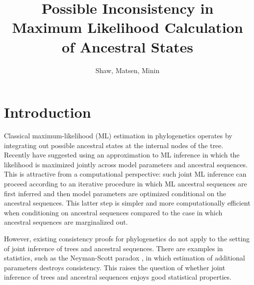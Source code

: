 \documentclass[a4paper]{article}
\title{Possible Inconsistency in Maximum Likelihood Calculation of Ancestral States}
\author{Shaw, Matsen, Minin}
\begin{document}
\maketitle


\renewcommand{\arraystretch}{1.2} %


\section*{Introduction}

Classical maximum-likelihood (ML) estimation in phylogenetics operates by integrating out possible ancestral states at the internal nodes of the tree.
Recently \cite{Neher2017} have suggested using an approximation to ML inference in which the likelihood is maximized jointly across model parameters and ancestral sequences.
This is attractive from a computational perspective: such joint ML inference can proceed according to an iterative procedure in which ML ancestral sequences are first inferred and then model parameters are optimized conditional on the ancestral sequences.
This latter step is simpler and more computationally efficient when conditioning on ancestral sequences compared to the case in which ancestral sequences are marginalized out.

However, existing consistency proofs for phylogenetics \cite{RoyChoudhury2015-ta} do not apply to the setting of joint inference of trees and ancestral sequences.
There are examples in statistics, such as the Neyman-Scott paradox \cite{Neyman1948-tt}, in which estimation of additional parameters destroys consistency.
This raises the question of whether joint inference of trees and ancestral sequences enjoys good statistical properties.
\end{document}
